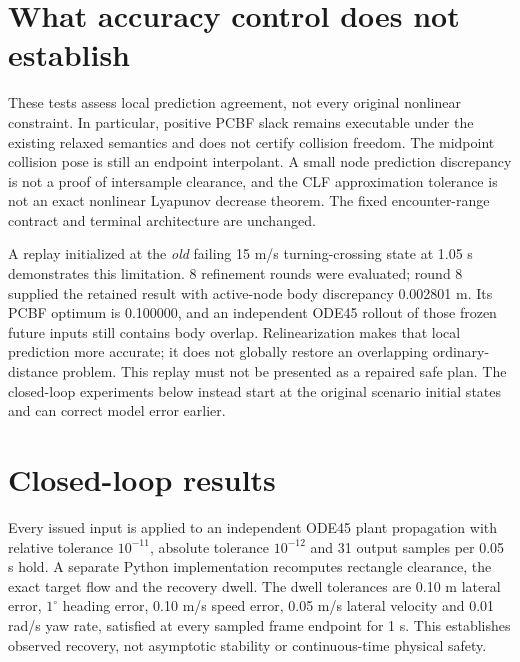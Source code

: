 \documentclass[11pt]{article}
\begin{document}
\section{What accuracy control does not establish}
These tests assess local prediction agreement, not every original nonlinear
constraint. In particular, positive PCBF slack remains executable under the
existing relaxed semantics and does not certify collision freedom. The
midpoint collision pose is still an endpoint interpolant. A small node
prediction discrepancy is not a proof of intersample clearance, and the CLF
approximation tolerance is not an exact nonlinear Lyapunov decrease theorem.
The fixed encounter-range contract and terminal architecture are unchanged.

A replay initialized at the \emph{old} failing 15 m/s turning-crossing state
at 1.05 s demonstrates this limitation. 8 refinement rounds
were evaluated; round 8 supplied the retained result with
active-node body discrepancy 0.002801 m. Its PCBF optimum is
0.100000, and an independent ODE45 rollout of those frozen future
inputs still contains body overlap. Relinearization
makes that local prediction more accurate; it does not globally restore an
overlapping ordinary-distance problem. This replay must not be presented as
a repaired safe plan. The closed-loop experiments below instead start at the
original scenario initial states and can correct model error earlier.

\section{Closed-loop results}
Every issued input is applied to an independent ODE45 plant propagation with
relative tolerance $10^{-11}$, absolute tolerance $10^{-12}$ and 31 output
samples per 0.05 s hold. A separate Python implementation recomputes rectangle
clearance, the exact target flow and the recovery dwell. The dwell tolerances
are 0.10 m lateral error, $1^\circ$ heading error, 0.10 m/s speed error,
0.05 m/s lateral velocity and 0.01 rad/s yaw rate, satisfied at every
sampled frame endpoint for 1 s. This establishes observed recovery,
not asymptotic stability or continuous-time physical safety.
\end{document}
